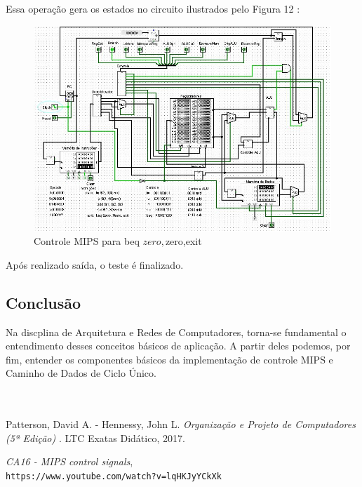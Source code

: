 \documentclass[
	article,
	11pt,
	oneside,
	a4paper,
	english,
	brazil,
	]{abntex2}
\begin{document}
Essa operação gera os estados no circuito ilustrados pelo Figura 12 :
        \begin{figure}[!htb]
        \centering
        \includegraphics[scale=0.5]{imagens/teste_5.JPG}
        \caption{Controle MIPS para beq $zero,$zero,exit}
        \label{fig:hostnetid}
        \end{figure}
        
Após realizado  saída, o teste é finalizado.

\subsection{Conclusão}
Na discplina de Arquitetura e Redes de Computadores, torna-se fundamental o entendimento desses conceitos básicos de aplicação. A partir deles podemos, por fim, entender os componentes básicos da implementação de controle MIPS e Caminho de Dados de Ciclo Único.
\\
\\
\\
\begin{thebibliography}{2}

Patterson, David A. - Hennessy, John L. 
\textit{Organização e Projeto de Computadores (5ª Edição)} . 
LTC Exatas Didático, 2017.

\textit{CA16 - MIPS control signals},
\\\texttt{https://www.youtube.com/watch?v=lqHKJyYCkXk}
\end{thebibliography}
\end{document}

